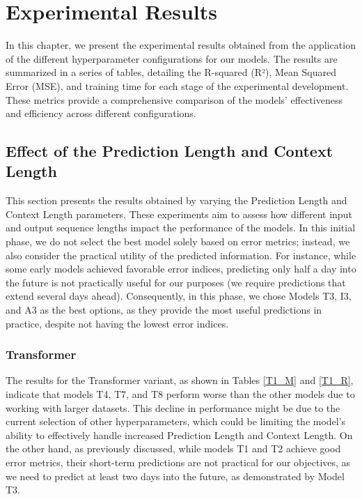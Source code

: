 \chapter{Experimental Results}
\pagestyle{esitscCD}

In this chapter, we present the experimental results obtained from the application of the different hyperparameter configurations for our models. The results are summarized in a series of tables, detailing the R-squared (R²), Mean Squared Error (MSE), and training time for each stage of the experimental development. These metrics provide a comprehensive comparison of the models' effectiveness and efficiency across different configurations.

\section{Effect of the Prediction Length and Context Length}
This section presents the results obtained by varying the Prediction Length and Context Length parameters. These experiments aim to assess how different input and output sequence lengths impact the performance of the models.
In this initial phase, we do not select the best model solely based on error metrics; instead, we also consider the practical utility of the predicted information. For instance, while some early models achieved favorable error indices, predicting only half a day into the future is not practically useful for our purposes (we require predictions that extend several days ahead). Consequently, in this phase, we chose Models T3, I3, and A3 as the best options, as they provide the most useful predictions in practice, despite not having the lowest error indices.

\subsection{Transformer}
The results for the Transformer variant, as shown in Tables \ref{T1_M} and \ref{T1_R}, indicate that models T4, T7, and T8 perform worse than the other models due to working with larger datasets. This decline in performance might be due to the current selection of other hyperparameters, which could be limiting the model's ability to effectively handle increased Prediction Length and Context Length. On the other hand, as previously discussed, while models T1 and T2 achieve good error metrics, their short-term predictions are not practical for our objectives, as we need to predict at least two days into the future, as demonstrated by Model T3.

